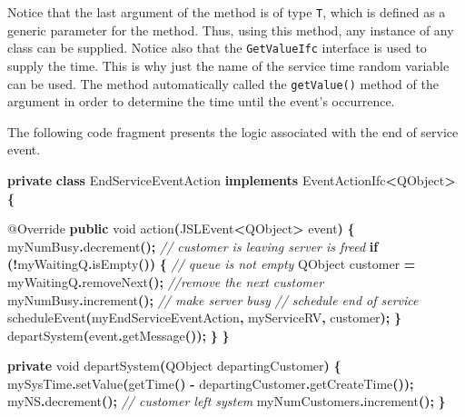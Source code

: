 \documentclass[
]{book}
\newenvironment{Shaded}{\begin{snugshade}}{\end{snugshade}}
\newcommand{\AttributeTok}[1]{\textcolor[rgb]{0.77,0.63,0.00}{#1}}
\newcommand{\CommentTok}[1]{\textcolor[rgb]{0.56,0.35,0.01}{\textit{#1}}}
\newcommand{\ControlFlowTok}[1]{\textcolor[rgb]{0.13,0.29,0.53}{\textbf{#1}}}
\newcommand{\DataTypeTok}[1]{\textcolor[rgb]{0.13,0.29,0.53}{#1}}
\newcommand{\FunctionTok}[1]{\textcolor[rgb]{0.00,0.00,0.00}{#1}}
\newcommand{\KeywordTok}[1]{\textcolor[rgb]{0.13,0.29,0.53}{\textbf{#1}}}
\newcommand{\NormalTok}[1]{#1}
\newcommand{\OperatorTok}[1]{\textcolor[rgb]{0.81,0.36,0.00}{\textbf{#1}}}
\theoremstyle{definition}
\theoremstyle{definition}
\theoremstyle{definition}
\theoremstyle{definition}
\theoremstyle{remark}
\begin{document}
Notice that the last argument of the method is of type \texttt{T}, which is defined as a generic parameter for the method. Thus, using this method, any instance of any class can be supplied.
Notice also that the \texttt{GetValueIfc} interface is used to supply the time.
This is why just the name of the service time random variable can be
used. The method automatically called the \texttt{getValue()} method of the
argument in order to determine the time until the event's occurrence.

The following code fragment presents the logic associated with the end
of service event.

\begin{Shaded}
\begin{Highlighting}[]
    \KeywordTok{private} \KeywordTok{class}\NormalTok{ EndServiceEventAction }\KeywordTok{implements}\NormalTok{ EventActionIfc}\OperatorTok{\textless{}}\NormalTok{QObject}\OperatorTok{\textgreater{}} \OperatorTok{\{}

        \AttributeTok{@Override}
        \KeywordTok{public} \DataTypeTok{void} \FunctionTok{action}\OperatorTok{(}\NormalTok{JSLEvent}\OperatorTok{\textless{}}\NormalTok{QObject}\OperatorTok{\textgreater{}}\NormalTok{ event}\OperatorTok{)} \OperatorTok{\{}
\NormalTok{            myNumBusy}\OperatorTok{.}\FunctionTok{decrement}\OperatorTok{();} \CommentTok{// customer is leaving server is freed}
            \ControlFlowTok{if} \OperatorTok{(!}\NormalTok{myWaitingQ}\OperatorTok{.}\FunctionTok{isEmpty}\OperatorTok{())} \OperatorTok{\{} \CommentTok{// queue is not empty}
\NormalTok{                QObject customer }\OperatorTok{=}\NormalTok{ myWaitingQ}\OperatorTok{.}\FunctionTok{removeNext}\OperatorTok{();} \CommentTok{//remove the next customer}
\NormalTok{                myNumBusy}\OperatorTok{.}\FunctionTok{increment}\OperatorTok{();} \CommentTok{// make server busy}
                \CommentTok{// schedule end of service}
                \FunctionTok{scheduleEvent}\OperatorTok{(}\NormalTok{myEndServiceEventAction}\OperatorTok{,}\NormalTok{ myServiceRV}\OperatorTok{,}\NormalTok{ customer}\OperatorTok{);}
            \OperatorTok{\}}
            \FunctionTok{departSystem}\OperatorTok{(}\NormalTok{event}\OperatorTok{.}\FunctionTok{getMessage}\OperatorTok{());}
        \OperatorTok{\}}
    \OperatorTok{\}}

    \KeywordTok{private} \DataTypeTok{void} \FunctionTok{departSystem}\OperatorTok{(}\NormalTok{QObject departingCustomer}\OperatorTok{)} \OperatorTok{\{}
\NormalTok{        mySysTime}\OperatorTok{.}\FunctionTok{setValue}\OperatorTok{(}\FunctionTok{getTime}\OperatorTok{()} \OperatorTok{{-}}\NormalTok{ departingCustomer}\OperatorTok{.}\FunctionTok{getCreateTime}\OperatorTok{());}
\NormalTok{        myNS}\OperatorTok{.}\FunctionTok{decrement}\OperatorTok{();} \CommentTok{// customer left system}
\NormalTok{        myNumCustomers}\OperatorTok{.}\FunctionTok{increment}\OperatorTok{();}
    \OperatorTok{\}}
\end{Highlighting}
\end{Shaded}
\end{document}
